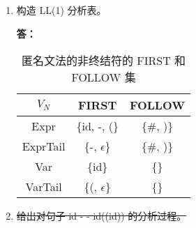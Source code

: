 \begin{enumerate}
    \begin{enumerate}
        \item 构造 LL(1) 分析表。
        
        \textbf{答：}
                
        \begin{table}[H]
            \centering
            \begin{tabular}{|c|c|c|}
                \hline
                $V_N$ & FIRST & FOLLOW \\
                \hline
                Expr & \{id, -, (\} & \{\#, )\} \\
                \hline
                ExprTail & \{-, $\epsilon$\} & \{\#, )\} \\
                \hline
                Var & \{id\} & \{\textvisiblespace\} \\
                \hline
                VarTail & \{(, $\epsilon$\} & \{\textvisiblespace\} \\
                \hline
            \end{tabular}
            \caption{匿名文法的非终结符的 FIRST 和 FOLLOW 集}
            \label{tab:FF4}
        \end{table}
        
        \begin{table}[H]
            \centering
            \caption{匿名文法的 LL(1) 预测分析表}
            \label{tab:PA4}
        \end{table}
        
        \item \sout{给出对句子 id - - id((id)) 的分析过程。}
    \end{enumerate}
    
\end{enumerate}